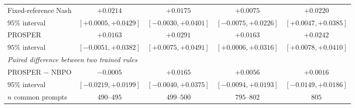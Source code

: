 \documentclass{article}
\theoremstyle{remark}
\theoremstyle{plain}
\begin{document}
\begin{table}[H]
\begin{tabular}{lcccc}
Fixed-reference Nash & $\mathbf{+0.0214}$ & $+0.0175$ & $+0.0075$ & $\mathbf{+0.0220}$\\
\quad $95\%$ interval & \tiny{$[+0.0005,+0.0429]$} & \tiny{$[-0.0030,+0.0401]$} & \tiny{$[-0.0075,+0.0226]$} & \tiny{$[+0.0047,+0.0385]$}\\
PROSPER & $+0.0163$ & $\mathbf{+0.0291}$ & $\mathbf{+0.0163}$ & $\mathbf{+0.0242}$\\
\quad $95\%$ interval & \tiny{$[-0.0051,+0.0382]$} & \tiny{$[+0.0075,+0.0491]$} & \tiny{$[+0.0006,+0.0316]$} & \tiny{$[+0.0078,+0.0410]$}\\
\midrule
\multicolumn{5}{l}{\emph{Paired difference between two trained rules}}\\
PROSPER $-$ NBPO & $-0.0005$ & $+0.0165$ & $+0.0056$ & $+0.0016$\\
\quad $95\%$ interval & \tiny{$[-0.0219,+0.0199]$} & \tiny{$[-0.0040,+0.0375]$} & \tiny{$[-0.0094,+0.0193]$} & \tiny{$[-0.0149,+0.0186]$}\\
\midrule
$n$ common prompts & $490$--$495$ & $499$--$500$ & $795$--$802$ & $805$\\
\bottomrule
\end{tabular}
\end{table}
\end{document}
